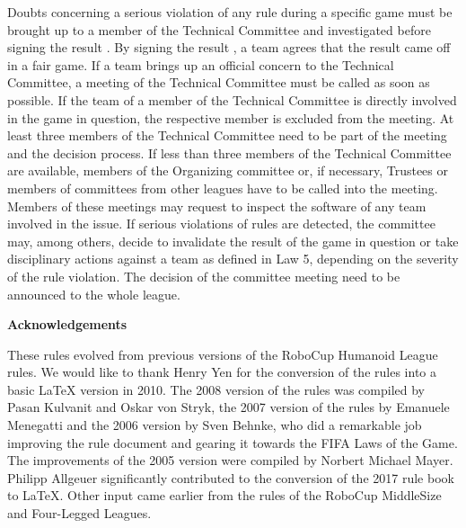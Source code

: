 Doubts concerning a serious violation of any rule during a specific game must be brought up to a member of the Technical Committee and investigated before  signing the result . By signing the result , a team agrees that the result came off in a fair game.  If a team brings up an official concern to the Technical Committee, a meeting of the Technical Committee must be called as soon as possible. If the team of a member of the Technical Committee is directly involved in the game in question, the respective member is excluded from the meeting. At least three members of the Technical Committee need to be part of the meeting and the decision process. If less than three members of the Technical Committee are available, members of the Organizing committee or, if necessary, Trustees or members of committees from other leagues have to be called into the meeting. Members of these meetings may request to inspect the   software of any team involved in the issue.  If serious violations of rules are detected, the committee may, among others, decide to invalidate the result of the game in question or take disciplinary actions against a team as defined in Law 5, depending on the severity of the rule violation. The decision of the committee meeting need to be announced to the whole league. 

\bigskip

{\bfseries Acknowledgements}

\headlinebox

These rules evolved from previous versions of the RoboCup Humanoid League rules. We would like to thank Henry Yen for the conversion of the rules into a basic LaTeX version in 2010. The 2008 version of the rules was compiled by Pasan Kulvanit and Oskar von Stryk, the 2007 version of the rules by Emanuele Menegatti and the 2006 version by Sven Behnke, who did a remarkable job improving the rule document and gearing it towards the FIFA Laws of the Game. The improvements of the 2005 version were compiled by Norbert Michael Mayer. Philipp Allgeuer significantly contributed to the conversion of the 2017 rule book to LaTeX.  Other input came earlier from the rules of the RoboCup MiddleSize and Four-Legged Leagues.

